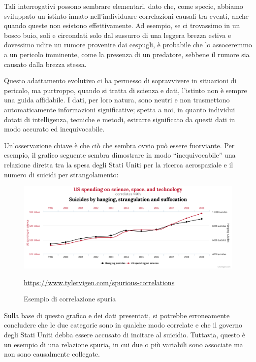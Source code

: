 Tali interrogativi possono sembrare elementari, dato che, come specie, 
abbiamo sviluppato un istinto innato nell'individuare correlazioni 
causali tra eventi, anche quando queste non esistono effettivamente. 
Ad esempio, se ci trovassimo in un bosco buio, soli e circondati 
solo dal sussurro di una leggera brezza estiva e dovessimo udire un 
rumore provenire dai cespugli, è probabile che lo assoceremmo a un 
pericolo imminente, come la presenza di un predatore, sebbene il 
rumore sia causato dalla brezza stessa.

Questo adattamento evolutivo ci ha permesso di sopravvivere in 
situazioni di pericolo, ma purtroppo, quando si tratta di scienza e dati, 
l'istinto non è sempre una guida affidabile. I dati, per loro natura, 
sono neutri e non trasmettono automaticamente informazioni significative; 
spetta a noi, in quanto individui dotati di intelligenza, 
tecniche e metodi, estrarre significato da questi dati in modo accurato 
ed inequivocabile.

Un'osservazione chiave è che ciò che sembra ovvio può essere fuorviante. 
Per esempio, il grafico seguente sembra dimostrare in modo 
``inequivocabile'' una relazione diretta tra la spesa degli Stati Uniti 
per la ricerca aerospaziale e il numero di suicidi per strangolamento:

\begin{figure}[H]
    \begin{center}
        \includegraphics[width=\linewidth]{img/chart.png}
        \caption{Esempio di correlazione spuria}
        \url{https://www.tylervigen.com/spurious-correlations}
        \label{fig:spurious_relations}
    \end{center}
\end{figure}

Sulla base di questo grafico e dei dati presentati, si potrebbe 
erroneamente concludere che le due categorie sono in qualche modo 
correlate e che il governo degli Stati Uniti debba essere 
accusato di incitare al suicidio. Tuttavia, questo è un esempio 
di una relazione spuria, in cui due o più variabili sono 
associate ma non sono causalmente collegate.

